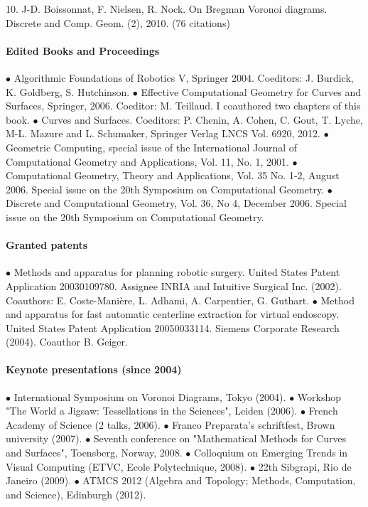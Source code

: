 10. J-D. Boissonnat, F. Nielsen, R. Nock. On Bregman Voronoi diagrams.
Discrete and Comp. Geom. (2), 2010. (76 citations)%



\paragraph{Edited Books and Proceedings}  \mbox{}

$\bullet$
Algorithmic Foundations of Robotics V, Springer 2004. Coeditors:  J. Burdick, 
K. Goldberg, S. Hutchinson.
$\bullet$ Effective Computational Geometry for Curves and Surfaces,
  Springer, 2006. Coeditor:  M. Teillaud. I coauthored two chapters of this book.
$\bullet$  Curves and Surfaces.
Coeditors:  P. Chenin, A. Cohen,  C. Gout, T. Lyche, M-L.  Mazure and L. Schumaker,
Springer Verlag LNCS Vol. 6920, 2012.
$\bullet$
Geometric Computing, special issue of the 
International Journal of Computational Geometry and Applications, Vol. 11, 
No. 1, 2001.
$\bullet$
Computational Geometry, Theory and Applications, Vol. 35 No. 1-2, August 2006.
Special issue on the 20th Symposium on Computational
Geometry.  %
$\bullet$ 
Discrete and Computational Geometry, Vol. 36, No 4, December 2006.
Special issue on the 20th Symposium on Computational
Geometry.  %



\paragraph{Granted patents} \mbox{}

$\bullet$  Methods and apparatus for planning robotic surgery. 
United States Patent Application 20030109780. Assignee INRIA and
Intuitive Surgical Inc. (2002).  Coauthors: E. Coste-Mani\`ere, L. Adhami,
A. Carpentier, G. Guthart.
$\bullet$  Method and apparatus for fast automatic centerline extraction for virtual 
endoscopy. United States Patent Application  20050033114. Siemens Corporate 
Research (2004). Coauthor B. Geiger.

\paragraph{Keynote presentations (since 2004)}\mbox{}

$\bullet$ International Symposium on Voronoi Diagrams, Tokyo (2004).
$\bullet$  Workshop "The World a Jigsaw: Tessellations in the Sciences", Leiden (2006).
$\bullet$  French Academy of Science (2 talks, 2006). 
$\bullet$  Franco Preparata's schriftfest, Brown university (2007). 
$\bullet$ Seventh conference on "Mathematical Methods for Curves and Surfaces", Toensberg, Norway, 2008. 
$\bullet$  Colloquium on Emerging Trends in Visual Computing (ETVC, Ecole Polytechnique, 2008). 
$\bullet$  22th Sibgrapi, Rio de Janeiro (2009).  
$\bullet$  ATMCS 2012 (Algebra and Topology; Methods, Computation, and Science), Edinburgh (2012).


